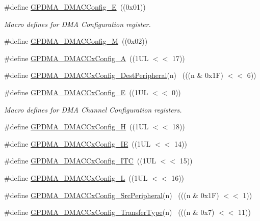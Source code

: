 \begin{DoxyCompactItemize}
\item 
\#define \hyperlink{group__GPDMA__17XX__40XX_ga253822f2712564a42379a76d9447cde4}{G\+P\+D\+M\+A\+\_\+\+D\+M\+A\+C\+Config\+\_\+E}~((0x01))
\begin{DoxyCompactList}\small\item\em Macro defines for D\+MA Configuration register. \end{DoxyCompactList}\item 
\#define \hyperlink{group__GPDMA__17XX__40XX_ga0f2a7e8c8704f5a897f911ac3a8617e3}{G\+P\+D\+M\+A\+\_\+\+D\+M\+A\+C\+Config\+\_\+M}~((0x02))
\item 
\#define \hyperlink{group__GPDMA__17XX__40XX_gae28eb1e74ecafc5e6170e3f7a8688335}{G\+P\+D\+M\+A\+\_\+\+D\+M\+A\+C\+Cx\+Config\+\_\+A}~((1\+U\+L $<$$<$ 17))
\item 
\#define \hyperlink{group__GPDMA__17XX__40XX_gae90fe60d160d07ffe1f667ff7d38b94d}{G\+P\+D\+M\+A\+\_\+\+D\+M\+A\+C\+Cx\+Config\+\_\+\+Dest\+Peripheral}(n)    ~(((n \& 0x1\+F) $<$$<$ 6))
\item 
\#define \hyperlink{group__GPDMA__17XX__40XX_ga1c7608bb37d512277e42672ee4e785a5}{G\+P\+D\+M\+A\+\_\+\+D\+M\+A\+C\+Cx\+Config\+\_\+E}~((1\+U\+L $<$$<$ 0))
\begin{DoxyCompactList}\small\item\em Macro defines for D\+MA Channel Configuration registers. \end{DoxyCompactList}\item 
\#define \hyperlink{group__GPDMA__17XX__40XX_ga987a4bb2d26cf2ef476483f347ad49ff}{G\+P\+D\+M\+A\+\_\+\+D\+M\+A\+C\+Cx\+Config\+\_\+H}~((1\+U\+L $<$$<$ 18))
\item 
\#define \hyperlink{group__GPDMA__17XX__40XX_ga0fb4c3e9768c0a757b6ff25f77b75a26}{G\+P\+D\+M\+A\+\_\+\+D\+M\+A\+C\+Cx\+Config\+\_\+\+IE}~((1\+U\+L $<$$<$ 14))
\item 
\#define \hyperlink{group__GPDMA__17XX__40XX_gac7c379cbf11a214f436620e4f7a7ee2a}{G\+P\+D\+M\+A\+\_\+\+D\+M\+A\+C\+Cx\+Config\+\_\+\+I\+TC}~((1\+U\+L $<$$<$ 15))
\item 
\#define \hyperlink{group__GPDMA__17XX__40XX_ga37a55c8ebde3d56defbf6281534237fe}{G\+P\+D\+M\+A\+\_\+\+D\+M\+A\+C\+Cx\+Config\+\_\+L}~((1\+U\+L $<$$<$ 16))
\item 
\#define \hyperlink{group__GPDMA__17XX__40XX_ga0704c2279f810122b08d3f43be5fde52}{G\+P\+D\+M\+A\+\_\+\+D\+M\+A\+C\+Cx\+Config\+\_\+\+Src\+Peripheral}(n)      ~(((n \& 0x1\+F) $<$$<$ 1))
\item 
\#define \hyperlink{group__GPDMA__17XX__40XX_ga27ab9d0828c9c04614320beb2f6dd234}{G\+P\+D\+M\+A\+\_\+\+D\+M\+A\+C\+Cx\+Config\+\_\+\+Transfer\+Type}(n)        ~(((n \& 0x7) $<$$<$ 11))
$$
\end{DoxyCompactItemize}
